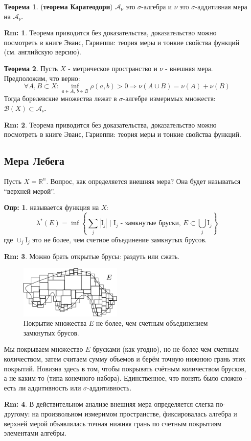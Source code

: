 \documentclass[12pt]{article}
\newcommand{\MR}{\mathbb{R}}
\newcommand{\MI}{\mathrm{I}}
\newcommand{\MA}{\mathcal{A}}
\newcommand{\MB}{\mathcal{B}}
\theoremstyle{definition}
\newtheorem{defn}{Опр:}
\newtheorem{rem}{Rm:}
\newtheorem{theorem}{Теорема}
\newcommand{\ddsum}[2]{\displaystyle\sum\limits_{#1}^{#2}}
\begin{document}
\begin{theorem}(\textbf{теорема Каратеодори})
	$\MA_\nu$ это $\sigma$-алгебра и $\nu$ это $\sigma$-аддитивная мера на $\MA_\nu$.
\end{theorem}
\begin{rem}
	Теорема приводится без доказательства, доказательство можно посмотреть в книге Эванс, Гариеппи: теория меры и тонкие свойства функций (см. английскую версию).
\end{rem}
\begin{theorem}
	Пусть $X$ - метрическое пространство и $\nu$ - внешняя мера. Предположим, что верно:
	$$
		\forall A,B \subset X\colon \inf\limits_{a \in A, \, b \in B}\rho(a,b) > 0 \Rightarrow \nu(A \cup B) = \nu(A) + \nu(B)
	$$
	Тогда борелевские множества лежат в $\sigma$-алгебре измеримых множеств: $\MB(X) \subset \MA_\nu$.
\end{theorem}
\begin{rem}
	Теорема приводится без доказательства, доказательство можно посмотреть в книге Эванс, Гариеппи: теория меры и тонкие свойства функций.
\end{rem}

\subsection*{Мера Лебега}
Пусть $X = \MR^n$. Вопрос, как определяется внешняя мера? Она будет называться ``верхней мерой''.
\begin{defn}
	 называется функция на $X$:
	$$
		\lambda^*(E) = \inf\left\{\ddsum{j}{}|\MI_j|\; \bigg\vert \; \MI_j \text{ - замкнутые бруски}, \, E \subset \bigcup\limits_{j}\MI_j  \right\}
	$$
	где $\cup_j \MI_j$ это не более, чем счетное объединение замкнутых брусов.
\end{defn}
\begin{rem}
	Можно брать открытые брусы: раздуть или сжать.
\end{rem}
\begin{figure}[H]
	\centering
	\includegraphics[width=0.45\textwidth]{MA4L11_2.png}
	\caption{Покрытие множества $E$ не более, чем счетным объединением замкнутых брусов.}
	\label{11_2}
\end{figure}
Мы покрываем множество $E$ брусками (как угодно), но не более чем счетным количеством, затем считаем сумму объемов и берём точную нижнюю грань этих покрытий. Новизна здесь в том, чтобы покрывать счётным количеством брусков, а не каким-то (типа конечного набора). Единственное, что понять было сложно - есть ли аддитивность или $\sigma$-аддитивность.
\begin{rem}
	В действительном анализе внешняя мера определяется слегка по-другому: на произвольном измеримом пространстве, фиксировалась алгебра и верхней мерой объявлялась точная нижняя грань по счетным покрытиям элементами алгебры.
\end{rem}
\end{document}

